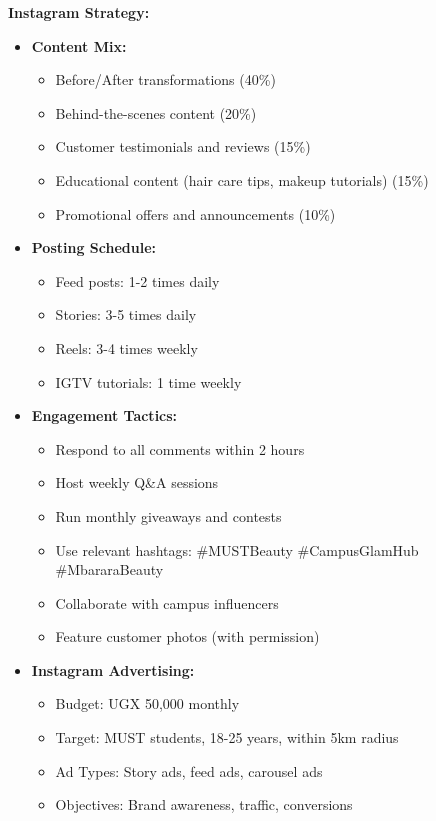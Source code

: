 \documentclass[a4paper,12pt]{article}
\begin{document}
\textbf{Instagram Strategy:}
\begin{itemize}[leftmargin=2em]
    \item \textbf{Content Mix:}
    \begin{itemize}
        \item Before/After transformations (40\%)
        \item Behind-the-scenes content (20\%)
        \item Customer testimonials and reviews (15\%)
        \item Educational content (hair care tips, makeup tutorials) (15\%)
        \item Promotional offers and announcements (10\%)
    \end{itemize}
    
    \item \textbf{Posting Schedule:}
    \begin{itemize}
        \item Feed posts: 1-2 times daily
        \item Stories: 3-5 times daily
        \item Reels: 3-4 times weekly
        \item IGTV tutorials: 1 time weekly
    \end{itemize}
    
    \item \textbf{Engagement Tactics:}
    \begin{itemize}
        \item Respond to all comments within 2 hours
        \item Host weekly Q\&A sessions
        \item Run monthly giveaways and contests
        \item Use relevant hashtags: \#MUSTBeauty \#CampusGlamHub \#MbararaBeauty
        \item Collaborate with campus influencers
        \item Feature customer photos (with permission)
    \end{itemize}
    
    \item \textbf{Instagram Advertising:}
    \begin{itemize}
        \item Budget: UGX 50,000 monthly
        \item Target: MUST students, 18-25 years, within 5km radius
        \item Ad Types: Story ads, feed ads, carousel ads
        \item Objectives: Brand awareness, traffic, conversions
    \end{itemize}
\end{itemize}
\end{document}
